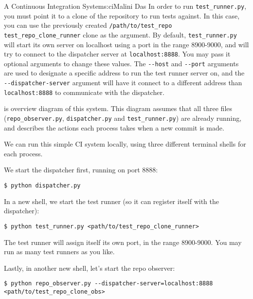 \begin{aosachapter}{A Continuous Integration System}{s:ci}{Malini Das}
In order to run \texttt{test\_runner.py}, you must point it to a clone
of the repository to run tests against. In this case, you can use the
previously created
\texttt{/path/to/test\_repo test\_repo\_clone\_runner} clone as the
argument. By default, \texttt{test\_runner.py} will start its own server
on localhost using a port in the range 8900-9000, and will try to
connect to the dispatcher server at \texttt{localhost:8888}. You may
pass it optional arguments to change these values. The \texttt{-{}-host}
and \texttt{-{}-port} arguments are used to designate a specific address
to run the test runner server on, and the \texttt{-{}-dispatcher-server}
argument will have it connect to a different address than
\texttt{localhost:8888} to communicate with the dispatcher.

\label{control-flow-diagram}

 is overview diagram of this system.
This diagram assumes that all three files (\texttt{repo\_observer.py},
\texttt{dispatcher.py} and \texttt{test\_runner.py}) are already
running, and describes the actions each process takes when a new commit
is made.


\label{running-the-code}

We can run this simple CI system locally, using three different terminal
shells for each process.

We start the dispatcher first, running on port 8888:

\begin{verbatim}
$ python dispatcher.py
\end{verbatim}

In a new shell, we start the test runner (so it can register itself with
the dispatcher):

\begin{verbatim}
$ python test_runner.py <path/to/test_repo_clone_runner>
\end{verbatim}

The test runner will assign itself its own port, in the range 8900-9000.
You may run as many test runners as you like.

Lastly, in another new shell, let's start the repo observer:

\begin{verbatim}
$ python repo_observer.py --dispatcher-server=localhost:8888 <path/to/test_repo_clone_obs>
\end{verbatim}


\end{aosachapter}

